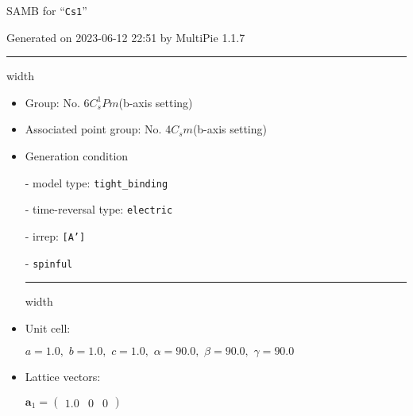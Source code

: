 \documentclass[fleqn,10pt,landscape]{article}
\begin{document}
\setcounter{MaxMatrixCols}{16}

\setlength{\baselineskip}{16pt}
\footnotesize
\begin{center}
\LARGE
SAMB for ``\texttt{Cs1}''
\end{center}
\begin{flushright}
Generated on 2023-06-12 22:51 by MultiPie 1.1.7
\end{flushright}
\vspace{1cm}


 \hfil \hrule height 1mm width \textwidth \hfil

\begin{itemize}
\item Group: No. 6\quad$C_{s}^{1}$\quad$Pm$\quad(b-axis setting)\quad[ monoclinic ]

\item Associated point group: No. 4\quad$C_{s}$\quad$m$\quad(b-axis setting)\quad[ monoclinic ]

\vspace{5mm}

\item Generation condition

\quad - model type: \texttt{tight_binding}

\quad - time-reversal type: \texttt{electric}

\quad - irrep: \texttt{[A']}

\quad - \texttt{spinful}


 \hfil \hrule height 1mm width \textwidth \hfil

\item Unit cell:

\quad $a=1.0,\,\, b=1.0,\,\, c=1.0,\,\, \alpha=90.0,\,\, \beta=90.0,\,\, \gamma=90.0$

\item Lattice vectors:

\quad $\bm{a}_1=\begin{pmatrix} 1.0 & 0 & 0 \end{pmatrix}$


\end{itemize}
\end{document}
